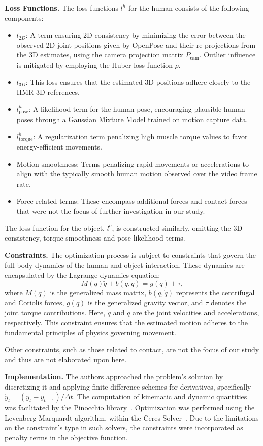 \noindent\textbf{Loss Functions.} The loss functions \(l^h\) for the human consists of the following components:

\begin{itemize}
    \item 
        \(l_{2D}\): A term ensuring 2D consistency by minimizing the error between the observed 2D joint positions given by OpenPose and 
        their re-projections from the 3D estimates, using the camera projection matrix \(P_{\text{cam}}\). Outlier influence is mitigated 
        by employing the Huber loss function \(\rho\).
    \item 
        \(l_{3D}\): This loss ensures that the estimated 3D positions adhere closely to the HMR 3D references.
    \item 
        \(l_{\text{pose}}^h\): A likelihood term for the human pose, encouraging plausible human poses through a Gaussian Mixture Model 
        trained on motion capture data.
    \item
        \(l_{\text{torque}}^h\): A regularization term penalizing high muscle torque values to favor energy-efficient movements.
    \item 
        Motion smoothness: Terms penalizing rapid movements or accelerations to align with the typically smooth human motion observed over 
        the video frame rate.
    \item
        Force-related terms: These encompass additional forces and contact forces that were not the focus of further investigation in our 
        study.
\end{itemize}

The loss function for the object, \(l^o\), is constructed similarly, omitting the 3D consistency, torque smoothness and pose likelihood terms.

\noindent\textbf{Constraints.} The optimization process is subject to constraints that govern the full-body dynamics of the human and object 
interaction. These dynamics are encapsulated by the Lagrange dynamics equation:
\[
M(q)\ddot{q} + b(q, \dot{q}) = g(q) + \tau,
\]
where \( M(q) \) is the generalized mass matrix, \( b(q, \dot{q}) \) represents the centrifugal and Coriolis forces, \( g(q) \) is the 
generalized gravity vector, and \( \tau \) denotes the joint torque contributions. Here, \( \dot{q} \) and \( \ddot{q} \) are the joint 
velocities and accelerations, respectively. This constraint ensures that the estimated motion adheres to the fundamental principles of physics 
governing movement.

Other constraints, such as those related to contact, are not the focus of our study and thus are not elaborated upon here.

\noindent\textbf{Implementation.} The authors approached the problem's solution by discretizing it and applying finite difference schemes 
for derivatives, specifically \(\dot{y}_t = (y_t - y_{t - 1}) / \Delta t\). The computation of kinematic and dynamic quantities was facilitated 
by the Pinocchio library~\cite{carpentier2019pinocchio}. Optimization was performed using the Levenberg-Marquardt algorithm, within the Ceres 
Solver~\cite{Agarwal_Ceres_Solver_2022}. Due to the limitations on the constraint's type in such solvers, the constraints were incorporated as 
penalty terms in the objective function.